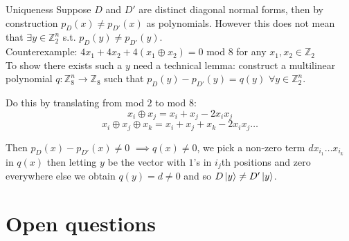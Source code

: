 \documentclass{beamer}
\theoremstyle{definition}
\begin{document}
\begin{frame}{Uniqueness}
Suppose $D$ and $D'$ are distinct diagonal normal forms, then by construction $p_D(x) \neq p_{D'}(x)$ as polynomials. However this does not mean that $\exists y \in \mathbb{Z}_2^n$ s.t. $p_D(y) \neq p_{D'}(y)$.\\

Counterexample: $4x_1 + 4x_2 + 4(x_1 \oplus x_2) = 0$ mod $8$ for any $x_1, x_2 \in \mathbb{Z}_2$\\

To show there exists such a $y$ need a technical lemma: construct a multilinear polynomial $q : \mathbb{Z}_8^n \rightarrow \mathbb{Z}_8$ such that $p_D(y)- p_{D'}(y) = q(y)$ $\forall y \in \mathbb{Z}_2^n$.

Do this by translating from mod $2$ to mod $8$:
$$ x_i \oplus x_j = x_i + x_j -2x_ix_j $$
$$ x_i \oplus x_j \oplus x_k = x_i + x_j + x_k -2x_ix_j \dots$$

Then $p_D(x) - p_{D'}(x) \neq 0$ $\implies q(x) \neq 0$, we pick a non-zero term $d x_{i_1} \dots x_{i_k}$ in $q(x)$ then letting $y$ be the vector with $1$'s in $i_j$th positions and zero everywhere else we obtain $q(y) = d \neq 0$ and so $D\ket{y} \neq D' \ket{y}$.
\end{frame}

\section{Open questions}
\end{document}
